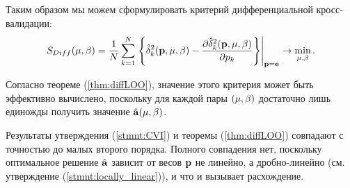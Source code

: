 Таким образом мы можем сформулировать критерий дифференциальной кросс-валидации:
\begin{equation*}
	S_{Diff}({\mu,\beta}) 
	= \frac1N\sum\limits_{k=1}^N \left. \left\{
		\hat{\delta}_k^2(\boldsymbol{\mathbf{p}}, {\mu,\beta})
		- \frac{\partial\hat{\delta}_k^2(\boldsymbol{\mathbf{p}}, {\mu,\beta})}{\partial p_k} 
	\right\}\right|_{\boldsymbol{\mathbf{p}}=\boldsymbol{\mathbf{e}}} \to \mathop{\mbox{min}}\limits_{{\mu,\beta}}.
\end{equation*}

Согласно теореме (\ref{thm:diffLOO}), значение этого критерия может быть эффективно вычислено, поскольку для каждой пары $({\mu,\beta})$ достаточно лишь единожды получить значение $\hat{\boldsymbol{\mathbf{a}}}({\mu,\beta})$.

Результаты утверждения (\ref{stmnt:CVI}) и теоремы (\ref{thm:diffLOO}) совпадают с точностью до малых второго порядка. 
Полного совпадения нет, поскольку оптимальное решение $\hat{\boldsymbol{\mathbf{a}}}$ зависит от весов $\boldsymbol{\mathbf{p}}$ не линейно, 
а дробно-линейно (см. утверждение (\ref{stmnt:locally_linear})), и что и вызывает расхождение.